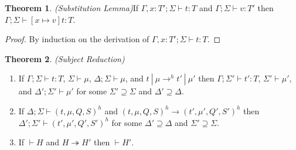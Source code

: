 \documentclass{article}
\theoremstyle{definition}
\newtheorem{thm}{Theorem}[section]
\begin{document}
\begin{thm}
\emph{(Substitution Lemma)}\label{th:subst}
If $\Gamma , x : T' ; \Sigma \vdash t : T$ and $\Gamma ; \Sigma \vdash v : T'$ then $\Gamma ; \Sigma \vdash [x \mapsto v]t : T$.
\end{thm}
\begin{proof}
By induction on the derivation of $\Gamma , x : T' ; \Sigma \vdash t : T$.
\end{proof}


\begin{thm}
\emph{(Subject Reduction)}\label{th:pres}

\begin{enumerate}

\item If $\Gamma ; \Sigma \vdash t : T$, $\Sigma \vdash \mu$, $\Delta ; \Sigma \vdash \mu$, and $t~|~\mu \rightarrow^h t'~|~\mu'$ then $\Gamma ; \Sigma' \vdash t' : T$, $\Sigma' \vdash \mu'$, and $\Delta' ; \Sigma' \vdash \mu'$ for some $\Sigma' \supseteq \Sigma$ and $\Delta' \supseteq \Delta$.

\item If $\Delta ; \Sigma \vdash (t, \mu, Q, S)^h$ and $(t, \mu, Q, S)^h \longrightarrow (t', \mu', Q', S')^h$ then $\Delta' ; \Sigma' \vdash (t', \mu', Q', S')^h$ for some $\Delta' \supseteq \Delta$ and $\Sigma' \supseteq \Sigma$.

\item If $\vdash H$ and $H \twoheadrightarrow H'$ then $\vdash H'$.

\end{enumerate}

\end{thm}
\end{document}
